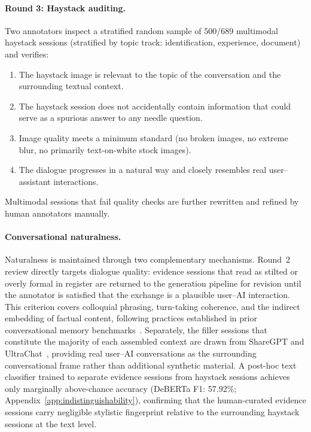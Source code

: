 \documentclass{llmxive}
\begin{document}
\paragraph{Round 3: Haystack auditing.}
Two annotators inspect a stratified random sample of 500/689 multimodal haystack sessions (stratified by topic track: identification, experience, document) and verifies:
\begin{enumerate}
    \item The haystack image is relevant to the topic of the conversation and the surrounding textual context.
    \item The haystack session does not accidentally contain information that could serve as a spurious answer to any needle question.
    \item Image quality meets a minimum standard (no broken images, no extreme blur, no primarily text-on-white stock images).
    \item The dialogue progresses in a natural way and closely resembles real user–assistant interactions.
\end{enumerate}
Multimodal sessions that fail quality checks are further rewritten and refined by human annotators manually.

\paragraph{Conversational naturalness.}
Naturalness is maintained through two complementary mechanisms. Round~2 review directly targets dialogue quality: evidence sessions that read as stilted or overly formal in register are returned to the generation pipeline for revision until the annotator is satisfied that the exchange is a plausible user--AI interaction. This criterion covers colloquial phrasing, turn-taking coherence, and the indirect embedding of factual content, following practices established in prior conversational memory benchmarks~\cite{wu2025longmemevalbenchmarkingchatassistants}. Separately, the filler sessions that constitute the majority of each assembled context are drawn from ShareGPT and UltraChat~\cite{ding2023enhancing}, providing real user--AI conversations as the surrounding conversational frame rather than additional synthetic material. A post-hoc text classifier trained to separate evidence sessions from haystack sessions achieves only marginally above-chance accuracy (DeBERTa F1: 57.92\%; Appendix~\ref{app:indistinguishability}), confirming that the human-curated evidence sessions carry negligible stylistic fingerprint relative to the surrounding haystack sessions at the text level.
\end{document}
